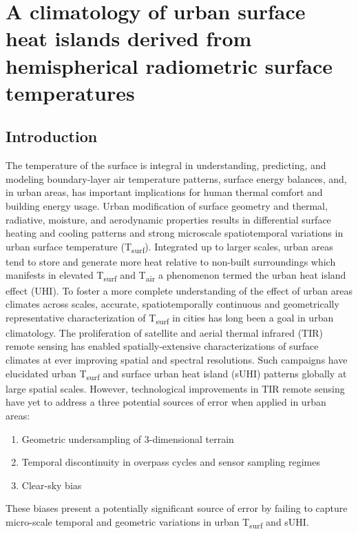 \chapter{A climatology of urban surface heat islands derived from hemispherical radiometric surface temperatures}

\section{Introduction}

The temperature of the surface is integral in understanding, predicting, and modeling boundary-layer air temperature patterns, surface energy balances, and, in urban areas, has important implications for human thermal comfort and building energy usage. Urban modification of surface geometry and thermal, radiative, moisture, and aerodynamic properties results in differential surface heating and cooling patterns and strong microscale spatiotemporal variations in urban surface temperature (T\textsubscript{surf}). Integrated up to larger scales, urban areas tend to store and generate more heat relative to non-built surroundings which manifests in elevated T\textsubscript{surf} and T\textsubscript{air} a phenomenon termed the urban heat island effect (UHI). To foster a more complete understanding of the effect of urban areas climates across scales, accurate, spatiotemporally continuous and geometrically representative characterization of T\textsubscript{surf} in cities has long been a goal in urban climatology. The proliferation of satellite and aerial thermal infrared (TIR) remote sensing has enabled spatially-extensive characterizations of surface climates at ever improving spatial and spectral resolutions. Such campaigns have elucidated urban T\textsubscript{surf} and surface urban heat island (sUHI) patterns globally at large spatial scales. However, technological improvements in TIR remote sensing have yet to address a three potential sources of error when applied in urban areas: 

\begin{enumerate}
	\item Geometric undersampling of 3-dimensional terrain
	\item Temporal discontinuity in overpass cycles and sensor sampling regimes
	\item Clear-sky bias
\end{enumerate}

\noindent These biases present a potentially significant source of error by failing to capture micro-scale temporal and geometric variations in urban T\textsubscript{surf} and sUHI. 

